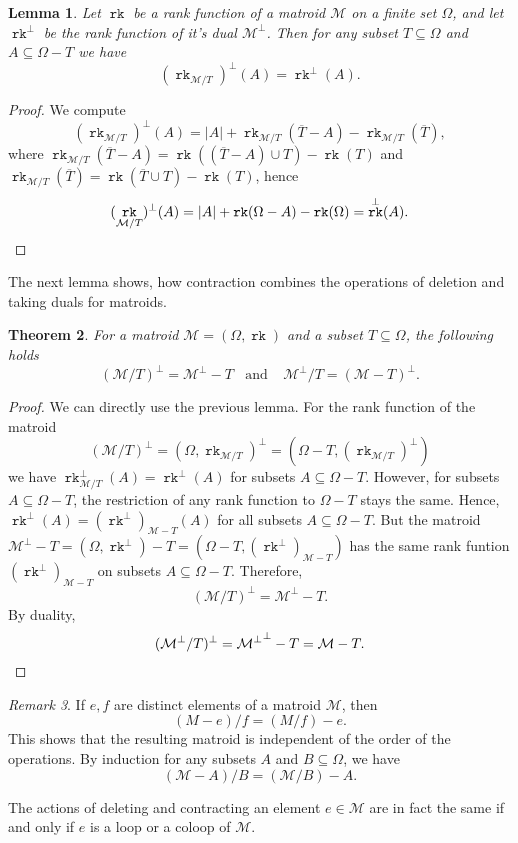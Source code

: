 \documentclass[12pt,a4paper, twoside, autooneside=false]{scrartcl}
\newtheorem{theorem}{Theorem}[section]
\newtheorem{lemma}[theorem]{Lemma}
\theoremstyle{definition}
\theoremstyle{remark}
\newtheorem{remark}[theorem]{Remark}
\numberwithin{equation}{section}
\DeclareMathOperator{\rk}{\mathtt{rk}}
\newcommand{\M}{\mathcal{M}} %
\begin{document}
\begin{lemma}
Let $\rk$ be a rank function of a matroid $\M$ on a finite set $\Omega$, and let $\rk^\perp$ be the rank function of it's dual $\M^\perp$. Then for any subset $T \subseteq \Omega$ and $A \subseteq \Omega - T$ we have
\[
(\rk_{\M / T})^\perp(A) = \rk^\perp(A).
\]
\end{lemma}
\begin{proof} 
We compute \[
(\rk_{\M / T})^\perp(A) = |A| + \rk_{\M / T}(\overline{T} - A) - \rk_{\M / T}(\overline{T}), 
\]
where $\rk_{\M / T}(\overline{T} - A) = \rk((\overline{T} - A) \cup T) - \rk(T)$ and $\rk_{\M / T}(\overline{T}) = \rk(\overline{T} \cup T) - \rk(T)$, hence 
\[
(\rk_{\M / T})^\perp(A) = |A| + \rk(\Omega - A) - \rk(\Omega) = \rk^\perp(A). \qedhere
\]
\end{proof}
The next lemma shows, how contraction combines the operations of deletion and taking duals for matroids.
\begin{theorem}For a matroid $\M = (\Omega, \rk)$ and a subset $T \subseteq \Omega$, the following holds
\[
{(\M / T)}^\perp = \M^\perp - T \ \ \ \ \text{and}  \ \ \ \ \ \M ^\perp / T = {(\M - T)}^\perp.
\]
\end{theorem}
\begin{proof}
We can directly use the previous lemma. For the rank function of the matroid \[
(\M / T)^\perp = (\Omega, \rk_{\M / T})^\perp = (\Omega - T, (\rk_{\M / T})^\perp)
\] we have $\rk_{\M/T}^\perp(A) = \rk^\perp(A)$ for subsets $A \subseteq \Omega - T$. However, for subsets $ A \subseteq \Omega - T$, the restriction of any rank function to $\Omega - T$ stays the same. Hence, $\rk^\perp(A) = (\rk^\perp)_{\M - T}(A)$ for all subsets $A \subseteq \Omega - T$. But the matroid $\M^\perp - T = (\Omega, \rk^\perp) - T = (\Omega - T, (\rk^\perp)_{\M - T})$ has the same rank funtion $(\rk^\perp)_{\M - T}$ on subsets $A \subseteq \Omega - T$. Therefore, 
\[
(\M/T)^\perp = \M^\perp - T. \]
By duality, 
\[
(\M^\perp / T)^\perp = {\M^\perp}^\perp - T = \M - T. \qedhere
\] 
\end{proof}
\begin{remark}
If  $e,f$ are distinct elements of a matroid $\M$, then 
\[
(M - e) / f = (M / f) - e. 
\]
This shows that the resulting matroid is independent of the order of the operations. By induction for any subsets $A$ and $B \subseteq \Omega$, we have 
\[
(\M - A) / B = (\M / B) - A. 
\]
\end{remark}
The actions of deleting and contracting an element $e \in \M$ are in fact the same if and only if $e$ is a loop or a coloop of $\M$.
\end{document}
